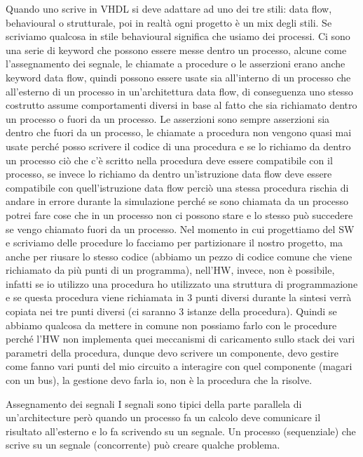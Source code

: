 \documentclass[10pt,a4paper,titlepage]{article}
\begin{document}
Quando uno scrive in VHDL si deve adattare ad uno dei tre stili: data flow, behavioural o strutturale, poi in realtà ogni progetto è un mix degli stili. Se scriviamo qualcosa in stile behavioural significa che usiamo dei processi. Ci sono una serie di keyword che possono essere messe dentro un processo, alcune come l’assegnamento dei segnale, le chiamate a procedure o le asserzioni erano anche keyword data flow, quindi possono essere usate sia all’interno di un processo che all’esterno di un processo in un’architettura data flow, di conseguenza uno stesso costrutto assume comportamenti diversi in base al fatto che sia richiamato dentro un processo o fuori da un processo. Le asserzioni sono sempre asserzioni sia dentro che fuori da un processo, le chiamate a procedura non vengono quasi mai usate perché posso scrivere il codice di una procedura e se lo richiamo da dentro un processo ciò che c’è scritto nella procedura deve essere compatibile con il processo, se invece lo richiamo da dentro un’istruzione data flow deve essere compatibile con quell’istruzione data flow perciò una stessa procedura rischia di andare in errore durante la simulazione perché se sono chiamata da un processo potrei fare cose che in un processo non ci possono stare e lo stesso può succedere se vengo chiamato fuori da un processo. Nel momento in cui progettiamo del SW e scriviamo delle procedure lo facciamo per partizionare il nostro progetto, ma anche per riusare lo stesso codice (abbiamo un pezzo di codice comune che viene richiamato da più punti di un programma), nell’HW, invece, non è possibile, infatti se io utilizzo una procedura ho utilizzato una struttura di programmazione e se questa procedura viene richiamata in 3 punti diversi durante la sintesi verrà copiata nei tre punti diversi (ci saranno 3 istanze della procedura). Quindi se abbiamo qualcosa da mettere in comune non possiamo farlo con le procedure perché l’HW non implementa quei meccanismi di caricamento sullo stack dei vari parametri della procedura, dunque devo scrivere un componente, devo gestire come fanno vari punti del mio circuito a interagire con quel componente (magari con un bus), la gestione devo farla io, non è la procedura che la risolve. 

Assegnamento dei segnali
I segnali sono tipici della parte parallela di un’architecture però quando un processo fa un calcolo deve comunicare il risultato all’esterno e lo fa scrivendo su un segnale. Un processo (sequenziale) che scrive su un segnale (concorrente) può creare qualche problema.
\end{document}
